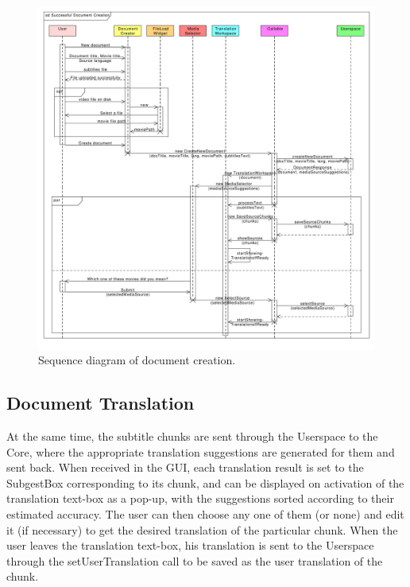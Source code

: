 \begin{figure}[h]
\begin{center}
\includegraphics[scale=0.40]{figures/document_creation_sequence_GUI.pdf}
\end{center}
\caption{Sequence diagram of document creation.}\label{gui:sd:document_creation}
\end{figure}

\subsection{Document Translation}

At the same time, the subtitle chunks are sent through the Userspace to the Core, where the appropriate translation suggestions are generated for them and sent back. When received in the GUI, each translation result is set to the SubgestBox corresponding to its chunk, and can be displayed on activation of the translation text-box as a pop-up, with the suggestions sorted according to their estimated accuracy.
The user can then choose any one of them (or none) and edit it (if necessary) to get the desired translation of the particular chunk. When the user leaves the translation text-box, his translation is sent to the Userspace through the setUserTranslation call to be saved as the user translation of the chunk.

